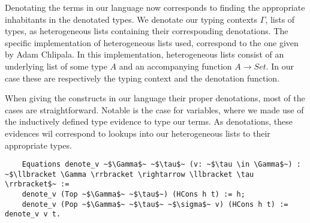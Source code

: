   Denotating the terms in our language now corresponds to finding the appropriate inhabitants in the denotated types.
  We denotate our typing contexts $\Gamma$, lists of types, as heterogeneous lists containing their corresponding denotations.
  The specific implementation of heterogeneous lists used, correspond to the one given by Adam Chlipala\cite{ChlipalaCPDT}.
  In this implementation, heterogeneous lists consist of an underlying list of some type $A$ and an accompanying function $A \rightarrow Set$.
  In our case these are respectively the typing context and the denotation function.

  When giving the constructs in our language their proper denotations, most of the cases are straightforward.
  Notable is the case for variables, where we made use of the inductively defined type evidence to type our terms.
  As denotations, these evidences wil correspond to lookups into our heterogeneous lists to their appropriate types.

  \begin{verbatim}
    Equations denote_v ~$\Gamma$~ ~$\tau$~ (v: ~$\tau \in \Gamma$~) : ~$\llbracket \Gamma \rrbracket \rightarrow \llbracket \tau \rrbracket$~ :=
    denote_v (Top ~$\Gamma$~ ~$\tau$~) (HCons h t) := h;
    denote_v (Pop ~$\Gamma$~ ~$\tau$~ ~$\sigma$~ v) (HCons h t) := denote_v v t.
  \end{verbatim}





